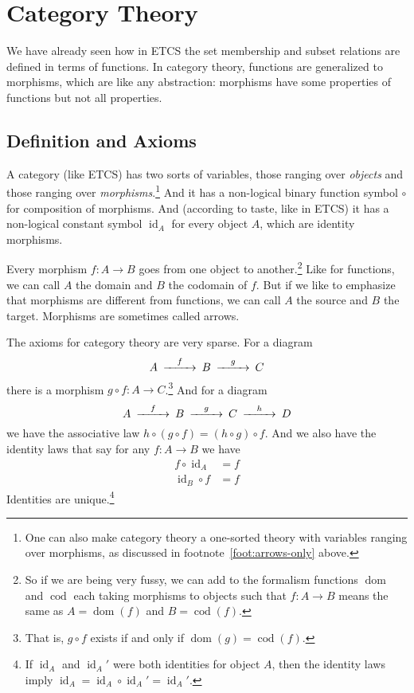 \documentclass[11pt]{article}
\DeclareMathOperator{\idfun}{id}
\DeclareMathOperator{\dom}{dom}
\DeclareMathOperator{\cod}{cod}
\begin{document}
\section{Category Theory}
\label{sec:category}

We have already seen how in ETCS the set membership and subset relations are
defined in terms of functions.  In category theory, functions are generalized
to morphisms, which are like any abstraction: morphisms have some properties of
functions but not all properties.

\subsection{Definition and Axioms}

A category (like ETCS) has two sorts of variables, those ranging over
\emph{objects} and those ranging over \emph{morphisms}.\footnote{One can also
make category theory a one-sorted theory with variables ranging over morphisms,
as discussed in footnote~\ref{foot:arrows-only} above.}
And it has a non-logical binary function
symbol $\circ$ for composition of morphisms.  And (according to taste, like
in ETCS) it has
a non-logical constant symbol $\idfun_A$ for every object $A$,
which are identity morphisms.

Every morphism $f : A \to B$ goes from one object to another.\footnote{So
if we are being very fussy, we can add to the formalism functions $\dom$
and $\cod$ each taking morphisms to objects such that $f : A \to B$ means
the same as $A = \dom(f)$ and $B = \cod(f)$.}
Like for functions, we can call $A$ the domain and $B$ the codomain of $f$.
But if we like to emphasize that morphisms are different from functions,
we can call $A$ the source and $B$ the target.
Morphisms are sometimes called arrows.

The axioms for category theory are very sparse.  For a diagram
\begin{equation} \label{diag:abc}
\begin{CD}
   A @>f>> B @>g>> C
\end{CD}
\end{equation}
there is a morphism $g \circ f : A \to C$.\footnote{That is,
$g \circ f$ exists if and only if $\dom(g) = \cod(f)$.}  And for a diagram
$$
\begin{CD}
   A @>f>> B @>g>> C @>h>> D
\end{CD}
$$
we have the associative law $h \circ (g \circ f) = (h \circ g) \circ f$.
And we also have the identity laws that say for any $f : A \to B$ we have
\begin{subequations}
\begin{align}
    f \circ \idfun_A & = f
    \label{eq:identity}
    \\
    \idfun_B \circ f & = f
    \label{eq:identity-too}
\end{align}
\end{subequations}
Identities are unique.\footnote{If $\idfun_A$ and $\idfun_A'$ were
both identities for object $A$, then the identity laws imply
$\idfun_A = \idfun_A \circ \idfun_A' = \idfun_A'$.\label{foot:identity}}
\end{document}
